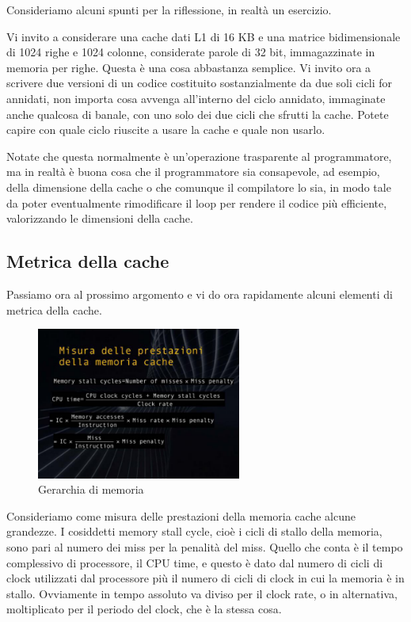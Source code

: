 
Consideriamo alcuni spunti per la riflessione, in realtà un esercizio.

Vi invito a considerare una cache dati L1 di 16 KB e una matrice bidimensionale di 1024 righe e 1024 colonne, considerate parole di 32 bit, immagazzinate in memoria per righe. Questa è una cosa abbastanza semplice.
Vi invito ora a scrivere due versioni di un codice costituito sostanzialmente da due soli cicli for annidati, non importa cosa avvenga all'interno del ciclo annidato, immaginate anche qualcosa di banale, con uno solo dei due cicli che sfrutti la cache. Potete capire con quale ciclo riuscite a usare la cache e quale non usarlo.

Notate che questa normalmente è un'operazione trasparente al programmatore, ma in realtà è buona cosa che il programmatore sia consapevole, ad esempio, della dimensione della cache o che comunque il compilatore lo sia, in modo tale da poter eventualmente rimodificare il loop per rendere il codice più efficiente, valorizzando le dimensioni della cache.

\subsection{Metrica della cache}
Passiamo ora al prossimo argomento e vi do ora rapidamente alcuni elementi di metrica della cache.

\FloatBarrier
\begin{figure}[H]
  \centering
  \includegraphics[width=0.60\textwidth,
                    trim=20 20 10 20, %
                    clip]
                    {images/Lez06_p04_fig_02.png}
  \caption{Gerarchia di memoria}
  \label{fig:Lez06_p04_fig_02}
\end{figure}
\FloatBarrier
\noindent

Consideriamo come misura delle prestazioni della memoria cache alcune grandezze.
I cosiddetti memory stall cycle, cioè i cicli di stallo della memoria, sono pari al numero dei miss per la penalità del miss.
Quello che conta è il tempo complessivo di processore, il CPU time, e questo è dato dal numero di cicli di clock utilizzati dal processore più il numero di cicli di clock in cui la memoria è in stallo.
Ovviamente in tempo assoluto va diviso per il clock rate, o in alternativa, moltiplicato per il periodo del clock, che è la stessa cosa.

